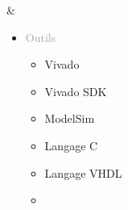 \documentclass{article}
\begin{document}
\begin{tabular}
\begin{itemize}
\begin{itemize}
\begin{itemize}
            \end{itemize}
        \end{itemize}
    \end{itemize}
    &
    \begin{itemize}
        [label={}, topsep=8pt, partopsep=0pt, itemsep=0.5pt, parsep=2pt,after=\vspace*{-\baselineskip}]
        \setlength{\itemsep}{10pt}
        \item \textcolor{darkGray}{Outils}
        \begin{itemize}
        [label={\textcolor{gray!100}{\checkmark}}, topsep=8pt, partopsep=0pt, itemsep=0.5pt, parsep=2pt,after=\vspace*{-\baselineskip}] 
            
            \item \textcolor{gray!100}{Vivado}
            \item \textcolor{gray!100}{Vivado SDK}
            \item \textcolor{gray!100}{ModelSim}
            \item \textcolor{gray!100}{Langage C}
            \item \textcolor{gray!100}{Langage VHDL}
            \item[\textcolor{white}{\checkmark}] \textcolor{gray!100}{} %

        \end{itemize}
    \end{itemize}
\end{tabular}


\begin{center}
\end{center}
\end{document}
